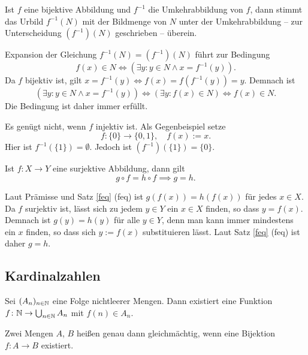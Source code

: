 \begin{Satz}
Ist $f$ eine bijektive Abbildung und $f^{-1}$ die Umkehrabbildung
von $f$, dann stimmt das Urbild $f^{-1}(N)$ mit der Bildmenge
von $N$ unter der Umkehrabbildung -- zur Unterscheidung $(f^{-1})(N)$
geschrieben -- überein.
\end{Satz}
\begin{Beweis}
Expansion der Gleichung $f^{-1}(N)=(f^{-1})(N)$ führt zur Bedingung
\[f(x)\in N\iff (\exists y\colon y\in N\land x=f^{-1}(y)).\]
Da $f$ bijektiv ist, gilt $x=f^{-1}(y)\iff f(x)=f(f^{-1}(y))=y$.
Demnach ist
\[(\exists y\colon y\in N\land x=f^{-1}(y))\iff (\exists y\colon f(x)\in N)\iff f(x)\in N.\]
Die Bedingung ist daher immer erfüllt.\;\qedsymbol
\end{Beweis}
Es genügt nicht, wenn $f$ injektiv ist. Als Gegenbeispiel setze
\[f\colon\{0\}\to\{0,1\},\quad f(x):=x.\]
Hier ist $f^{-1}(\{1\})=\emptyset$. Jedoch ist
$(f^{-1})(\{1\})=\{0\}$.

\begin{Satz}\newlinefirst
Ist $f\colon X\to Y$ eine surjektive Abbildung, dann gilt
\[g\circ f = h\circ f \implies g=h.\]
\end{Satz}
\begin{Beweis}
Laut Prämisse und Satz \ref{feq} (feq) ist $g(f(x)) = h(f(x))$
für jedes $x\in X$. Da $f$ surjektiv ist, lässt sich zu
jedem $y\in Y$ ein $x\in X$ finden, so dass $y=f(x)$. Demnach ist
$g(y)=h(y)$ für alle $y\in Y$, denn man kann immer mindestens
ein $x$ finden, so dass sich $y:=f(x)$ substituieren lässt.
Laut Satz \ref{feq} (feq) ist daher $g=h$.\;\qedsymbol
\end{Beweis}

\newpage
\subsection{Kardinalzahlen}

\begin{Axiom}\label{acc}%
Sei $(A_n)_{n\in\mathbb N}$ eine Folge nichtleerer Mengen.
Dann existiert eine Funktion $f\colon\mathbb N\to\bigcup_{n\in\mathbb N} A_n$
mit $f(n)\in A_n$.
\end{Axiom}

\begin{Definition}%
\label{def:equipotent}
Zwei Mengen $A$, $B$ heißen genau dann gleichmächtig, wenn
eine Bijektion $f\colon A\to B$ existiert.
\end{Definition}

